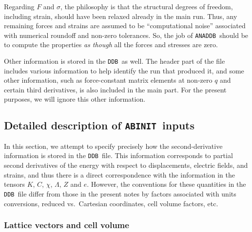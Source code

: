 \documentclass[11pt,fleqn]{article}
\def\ABINIT{{{\tt ABINIT}}}
\def\ANADDB{{\tt ANADDB}}
\def\DDB{{\tt DDB}}
\begin{document}
Regarding $F$ and $\sigma$,
the philosophy is that the structural degrees of freedom,
including strain, should have been relaxed already in the main
run.  Thus, any remaining forces and strains are assumed to be
``computational noise'' associated with numerical roundoff and
non-zero tolerances.  So, the job of \ANADDB\ should be to compute
the properties {\it as though} all the forces and stresses are
zero.

Other information is stored in the \DDB\ as well.  The header part
of the file includes various information to help identify the run
that produced it, and some other information, such as force-constant
matrix elements at non-zero $q$ and certain third derivatives, is
also included in the main part.  For the present purposes,
we will ignore this other information.


\subsection{Detailed description of \ABINIT\ inputs}
\label{sec:ab-detail}

In this section, we attempt to specify precisely how the
second-derivative information is stored in the \DDB\ file.
This information corresponds to partial second derivatives of the
energy with respect to displacements, electric fields, and strains,
and thus there is a direct correspondence with the information
in the tensors $K$, $C$, $\chi$, $\Lambda$, $Z$ and $e$.
However, the conventions for these quantities in the \DDB\ file
differ from those in the present notes by factors associated
with units conversions, reduced vs.~Cartesian coordinates,
cell volume factors, etc.

\subsubsection{Lattice vectors and cell volume}
\end{document}
